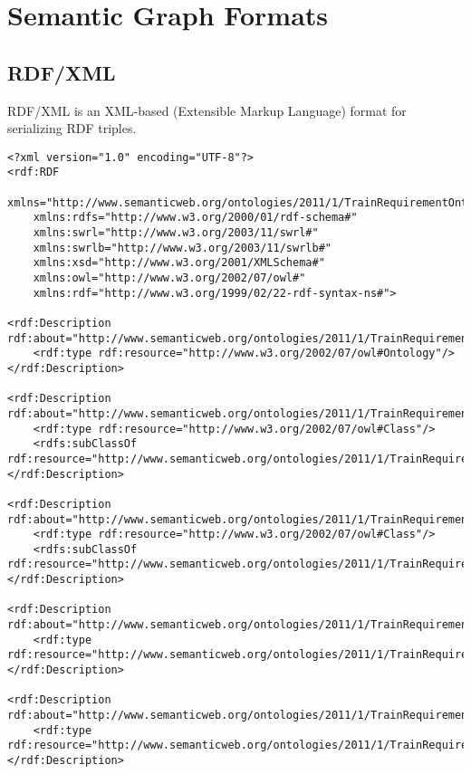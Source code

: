 \section{Semantic Graph Formats}

\subsection{RDF/XML}
\label{rdfxml-example}

RDF/XML is an XML-based (Extensible Markup Language) format for serializing RDF triples.

\lstset{language=XML,breaklines=true}
\begin{lstlisting}[caption=A graph based on the railway system metamodel stored in RDF format]
<?xml version="1.0" encoding="UTF-8"?>
<rdf:RDF
	xmlns="http://www.semanticweb.org/ontologies/2011/1/TrainRequirementOntology.owl#"
	xmlns:rdfs="http://www.w3.org/2000/01/rdf-schema#"
	xmlns:swrl="http://www.w3.org/2003/11/swrl#"
	xmlns:swrlb="http://www.w3.org/2003/11/swrlb#"
	xmlns:xsd="http://www.w3.org/2001/XMLSchema#"
	xmlns:owl="http://www.w3.org/2002/07/owl#"
	xmlns:rdf="http://www.w3.org/1999/02/22-rdf-syntax-ns#">

<rdf:Description rdf:about="http://www.semanticweb.org/ontologies/2011/1/TrainRequirementOntology.owl">
	<rdf:type rdf:resource="http://www.w3.org/2002/07/owl#Ontology"/>
</rdf:Description>

<rdf:Description rdf:about="http://www.semanticweb.org/ontologies/2011/1/TrainRequirementOntology.owl#Segment">
	<rdf:type rdf:resource="http://www.w3.org/2002/07/owl#Class"/>
	<rdfs:subClassOf rdf:resource="http://www.semanticweb.org/ontologies/2011/1/TrainRequirementOntology.owl#Trackelement"/>
</rdf:Description>

<rdf:Description rdf:about="http://www.semanticweb.org/ontologies/2011/1/TrainRequirementOntology.owl#Switch">
	<rdf:type rdf:resource="http://www.w3.org/2002/07/owl#Class"/>
	<rdfs:subClassOf rdf:resource="http://www.semanticweb.org/ontologies/2011/1/TrainRequirementOntology.owl#Trackelement"/>
</rdf:Description>

<rdf:Description rdf:about="http://www.semanticweb.org/ontologies/2011/1/TrainRequirementOntology.owl#1">
	<rdf:type rdf:resource="http://www.semanticweb.org/ontologies/2011/1/TrainRequirementOntology.owl#Sensor"/>
</rdf:Description>

<rdf:Description rdf:about="http://www.semanticweb.org/ontologies/2011/1/TrainRequirementOntology.owl#2">
	<rdf:type rdf:resource="http://www.semanticweb.org/ontologies/2011/1/TrainRequirementOntology.owl#Route"/>
</rdf:Description>


\end{lstlisting}
